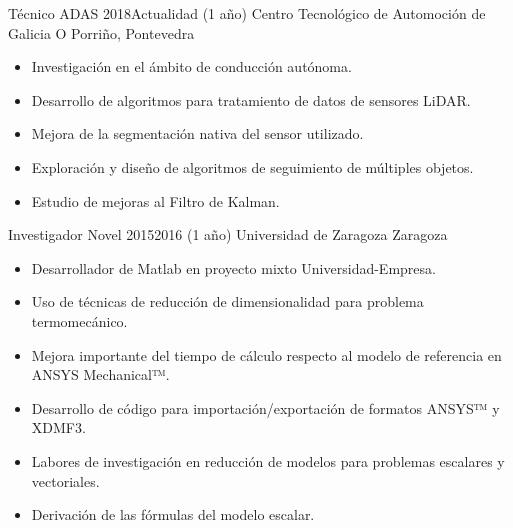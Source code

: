\cvitem
    {Técnico ADAS} %
    {2018}{Actualidad (1 año)} %
    {Centro Tecnológico de Automoción de Galicia} %
    {O Porriño, Pontevedra} %
\begin{itemize}
    \small
    \item Investigación en el ámbito de conducción autónoma.
    \item Desarrollo de algoritmos para tratamiento de datos de sensores LiDAR.
    \item Mejora de la segmentación nativa del sensor utilizado.
    \item Exploración y diseño de algoritmos de seguimiento de múltiples objetos.
    \item Estudio de mejoras al Filtro de Kalman.
\end{itemize}

\cvitem
    {Investigador Novel} %
    {2015}{2016 (1 año)} %
    {Universidad de Zaragoza} %
    {Zaragoza} %
\begin{itemize}
    \small
    \item Desarrollador de Matlab en proyecto mixto Universidad-Empresa.
    \item Uso de técnicas de reducción de dimensionalidad para problema termomecánico.
    \item Mejora importante del tiempo de cálculo respecto al modelo de referencia en ANSYS Mechanical™.
    \item Desarrollo de código para importación/exportación de formatos ANSYS™ y XDMF3.
    \item Labores de investigación en reducción de modelos para problemas escalares y vectoriales.
    \item Derivación de las fórmulas del modelo escalar.
\end{itemize}

